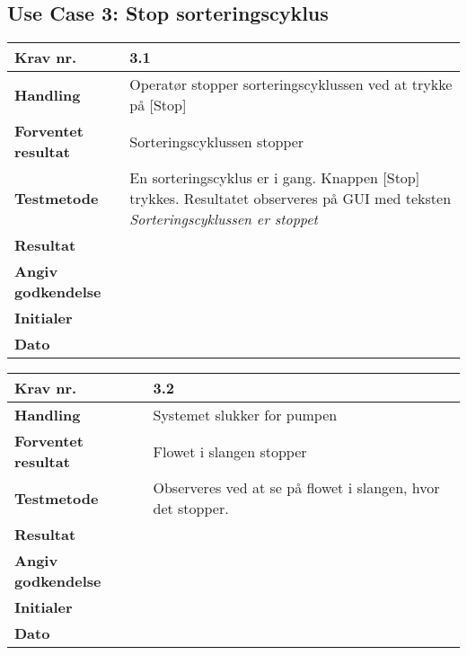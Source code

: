 \newpage
  \subsection{Use Case 3: Stop sorteringscyklus}

	\begin{center}
		\begin{longtable}{ | m{4cm}| m{8.5cm}|} 
			\hline
			\textbf{Krav nr.} & 3.1  \\ 
			\hline
			\textbf{Handling} & Operatør stopper sorteringscyklussen ved at trykke på [Stop] \\
			\hline
			\textbf{Forventet resultat} & Sorteringscyklussen stopper \\
			\hline
			\textbf{Testmetode}  &En sorteringscyklus er i gang. Knappen [Stop] trykkes. Resultatet observeres på GUI med teksten \textit{Sorteringscyklussen er stoppet} \\
			\hline
			\textbf{Resultat}  &    \\
			\hline
			\textbf{Angiv godkendelse} &     \\
			\hline
			\textbf{Initialer} &     \\
			\hline
			\textbf{Dato} &    \\
			\hline
		\end{longtable}
	\end{center}
			
	\begin{center}
		\begin{longtable}{ | m{4cm}| m{8.5cm}|} 
			\hline
			\textbf{Krav nr.} & 3.2  \\ 
			\hline
			\textbf{Handling} & Systemet slukker for pumpen \\
			\hline
			\textbf{Forventet resultat} & Flowet i slangen stopper \\
			\hline
			\textbf{Testmetode}  & Observeres ved at se på flowet i slangen, hvor det stopper.  \\
			\hline
			\textbf{Resultat}  &    \\
			\hline
			\textbf{Angiv godkendelse} &     \\
			\hline
			\textbf{Initialer} &     \\
			\hline
			\textbf{Dato} &    \\
			\hline
		\end{longtable}
	\end{center}
			
